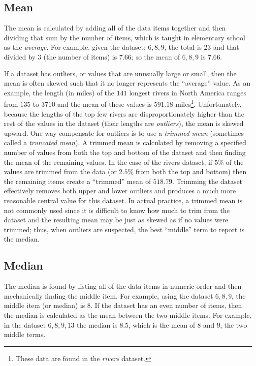 \subsection{Mean}\label{lab03_mean}

The mean is calculated by adding all of the data items together and then dividing that sum by the number of items, which is taught in elementary school as the \textit{average}. For example, given the dataset: $ 6, 8, 9 $, the total is $ 23 $ and that divided by $ 3 $ (the number of items) is $ 7.66 $; so the mean of $ 6, 8, 9 $ is $ 7.66 $.

If a dataset has outliers, or values that are unusually large or small, then the mean is often skewed such that it no longer represents the ``average'' value. As an example, the length (in miles) of the $ 141 $ longest rivers in North America ranges from $ 135 $ to $ 3710 $ and the mean of these values is $ 591.18 $ miles\footnote{These data are found in the \textit{rivers} dataset.}. Unfortunately, because the lengths of the top few rivers are disproportionately higher than the rest of the values in the dataset (their lengths are \textit{outliers}), the mean is skewed upward. One way compensate for outliers is to use a \textit{trimmed mean} (sometimes called a \textit{truncated mean}). A trimmed mean is calculated by removing a specified number of values from both the top and bottom of the dataset and then finding the mean of the remaining values. In the case of the rivers dataset, if $ 5\% $ of the values are trimmed from the data (or $ 2.5\% $ from both the top and bottom) then the remaining items create a ``trimmed'' mean of $ 518.79 $. Trimming the dataset effectively removes both upper and lower outliers and produces a much more reasonable central value for this dataset. In actual practice, a trimmed mean is not commonly used since it is difficult to know how much to trim from the dataset and the resulting mean may be just as skewed as if no values were trimmed; thus, when outliers are suspected, the best ``middle'' term to report is the median.

\subsection{Median}\label{lab03_median}

The median is found by listing all of the data items in numeric order and then mechanically finding the middle item. For example, using the dataset $ 6, 8, 9 $, the middle item (or median) is $ 8 $. If the dataset has an even number of items, then the median is calculated as the mean between the two middle items. For example, in the dataset $ 6, 8, 9, 13 $ the median is $ 8.5 $, which is the mean of $ 8 $ and $ 9 $, the two middle terms.

